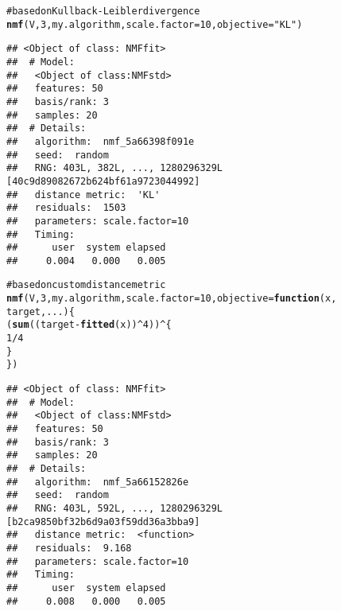 \documentclass[a4paper]{article}\usepackage{graphicx, color}
\makeatletter
\newcommand{\hlfunctioncall}[1]{\textcolor[rgb]{0.501960784313725,0,0.329411764705882}{\textbf{#1}}}%
\newcommand{\hlstring}[1]{\textcolor[rgb]{0.6,0.6,1}{#1}}%
\newcommand{\hlcomment}[1]{\textcolor[rgb]{0.180392156862745,0.6,0.341176470588235}{#1}}%
\newenvironment{kframe}{%
 \def\at@end@of@kframe{}%
 \ifinner\ifhmode%
  \def\at@end@of@kframe{\end{minipage}}%
  \begin{minipage}{\columnwidth}%
 \fi\fi%
 \def\FrameCommand##1{\hskip\@totalleftmargin \hskip-\fboxsep
 \colorbox{shadecolor}{##1}\hskip-\fboxsep
     \hskip-\linewidth \hskip-\@totalleftmargin \hskip\columnwidth}%
 \MakeFramed {\advance\hsize-\width
   \@totalleftmargin\z@ \linewidth\hsize
   \@setminipage}}%
 {\par\unskip\endMakeFramed%
 \at@end@of@kframe}
\newenvironment{knitrout}{}{} %
\makeatother
\begin{document}
\begin{knitrout}
\color{fgcolor}\begin{kframe}
\begin{alltt}
\hlcomment{# based on Kullback-Leibler divergence}
\hlfunctioncall{nmf}(V, 3, my.algorithm, scale.factor = 10, objective = \hlstring{"KL"})
\end{alltt}
\begin{verbatim}
## <Object of class: NMFfit>
##  # Model:
##   <Object of class:NMFstd>
##   features: 50 
##   basis/rank: 3 
##   samples: 20 
##  # Details:
##   algorithm:  nmf_5a66398f091e 
##   seed:  random 
##   RNG: 403L, 382L, ..., 1280296329L [40c9d89082672b624bf61a9723044992]
##   distance metric:  'KL' 
##   residuals:  1503 
##   parameters: scale.factor=10 
##   Timing:
##      user  system elapsed 
##     0.004   0.000   0.005
\end{verbatim}
\begin{alltt}
\hlcomment{# based on custom distance metric}
\hlfunctioncall{nmf}(V, 3, my.algorithm, scale.factor = 10, objective = \hlfunctioncall{function}(x, 
    target, ...) \{
    (\hlfunctioncall{sum}((target - \hlfunctioncall{fitted}(x))^4))^\{
        1/4
    \}
\})
\end{alltt}
\begin{verbatim}
## <Object of class: NMFfit>
##  # Model:
##   <Object of class:NMFstd>
##   features: 50 
##   basis/rank: 3 
##   samples: 20 
##  # Details:
##   algorithm:  nmf_5a66152826e 
##   seed:  random 
##   RNG: 403L, 592L, ..., 1280296329L [b2ca9850bf32b6d9a03f59dd36a3bba9]
##   distance metric:  <function> 
##   residuals:  9.168 
##   parameters: scale.factor=10 
##   Timing:
##      user  system elapsed 
##     0.008   0.000   0.005
\end{verbatim}
\end{kframe}
\end{knitrout}


%
%
\end{document}
